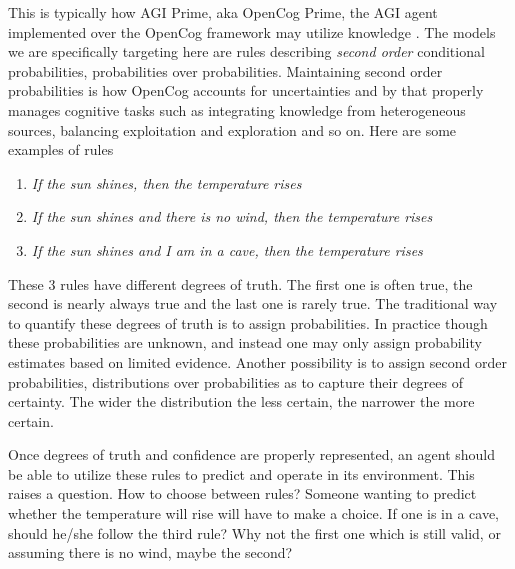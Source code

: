 \documentclass[runningheads]{llncs}
\begin{document}
This is typically how AGI Prime, aka OpenCog Prime, the AGI agent
implemented over the OpenCog framework may utilize knowledge
\cite{Goertzel15Speculative}. The models we are specifically targeting
here are rules describing \emph{second order} conditional
probabilities, probabilities over probabilities. Maintaining second
order probabilities is how OpenCog accounts for uncertainties
\cite{Ikle08Probabilistic} and by that properly manages cognitive
tasks such as integrating knowledge from heterogeneous sources,
balancing exploitation and exploration and so on.
Here are some examples of rules
\begin{enumerate}
\item {\it If the sun shines, then the temperature rises}
\item {\it If the sun shines and there is no wind, then the temperature rises}
\item {\it If the sun shines and I am in a cave, then the temperature
    rises}
\end{enumerate}

These 3 rules have different degrees of truth. The first one is often
true, the second is nearly always true and the last one is rarely
true. The traditional way to quantify these degrees of truth is to
assign probabilities. In practice though these probabilities are
unknown, and instead one may only assign probability estimates based
on limited evidence. Another possibility is to assign second order
probabilities, distributions over probabilities as to capture their
degrees of certainty. The wider the distribution the less certain, the
narrower the more certain.





Once degrees of truth and confidence are properly represented, an
agent should be able to utilize these rules to predict and operate in
its environment. This raises a question. How to choose between rules?
Someone wanting to predict whether the temperature will rise will have
to make a choice. If one is in a cave, should he/she follow the third
rule? Why not the first one which is still valid, or assuming there is
no wind, maybe the second?
\end{document}
